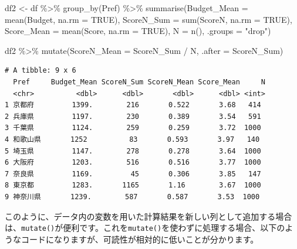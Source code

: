\documentclass[
  a4paper,
  pandoc,
  ja=standard,
  jafont=haranoaji]{bxjsbook}
\newenvironment{Shaded}{\begin{snugshade}}{\end{snugshade}}
\newcommand{\AttributeTok}[1]{\textcolor[rgb]{0.00,0.48,0.65}{#1}}
\newcommand{\ConstantTok}[1]{\textcolor[rgb]{0.56,0.35,0.01}{#1}}
\newcommand{\FunctionTok}[1]{\textcolor[rgb]{0.28,0.35,0.67}{#1}}
\newcommand{\NormalTok}[1]{\textcolor[rgb]{0.00,0.48,0.65}{#1}}
\newcommand{\OtherTok}[1]{\textcolor[rgb]{0.00,0.48,0.65}{#1}}
\newcommand{\SpecialCharTok}[1]{\textcolor[rgb]{0.37,0.37,0.37}{#1}}
\newcommand{\StringTok}[1]{\textcolor[rgb]{0.13,0.47,0.30}{#1}}
\begin{document}
\begin{Shaded}
\begin{Highlighting}[numbers=left,,]
\NormalTok{df2 }\OtherTok{\textless{}{-}}\NormalTok{ df }\SpecialCharTok{\%\textgreater{}\%}
  \FunctionTok{group\_by}\NormalTok{(Pref) }\SpecialCharTok{\%\textgreater{}\%}
  \FunctionTok{summarise}\NormalTok{(}\AttributeTok{Budget\_Mean =} \FunctionTok{mean}\NormalTok{(Budget, }\AttributeTok{na.rm =} \ConstantTok{TRUE}\NormalTok{),}
            \AttributeTok{ScoreN\_Sum  =} \FunctionTok{sum}\NormalTok{(ScoreN, }\AttributeTok{na.rm =} \ConstantTok{TRUE}\NormalTok{),}
            \AttributeTok{Score\_Mean  =} \FunctionTok{mean}\NormalTok{(Score, }\AttributeTok{na.rm =} \ConstantTok{TRUE}\NormalTok{),}
            \AttributeTok{N           =} \FunctionTok{n}\NormalTok{(),}
            \AttributeTok{.groups     =} \StringTok{"drop"}\NormalTok{)}
\end{Highlighting}
\end{Shaded}

\begin{Shaded}
\begin{Highlighting}[numbers=left,,]
\NormalTok{df2 }\SpecialCharTok{\%\textgreater{}\%}
  \FunctionTok{mutate}\NormalTok{(}\AttributeTok{ScoreN\_Mean =}\NormalTok{ ScoreN\_Sum }\SpecialCharTok{/}\NormalTok{ N,}
         \AttributeTok{.after      =}\NormalTok{ ScoreN\_Sum)}
\end{Highlighting}
\end{Shaded}

\begin{verbatim}
# A tibble: 9 x 6
  Pref     Budget_Mean ScoreN_Sum ScoreN_Mean Score_Mean     N
  <chr>          <dbl>      <dbl>       <dbl>      <dbl> <int>
1 京都府         1399.        216       0.522       3.68   414
2 兵庫県         1197.        230       0.389       3.54   591
3 千葉県         1124.        259       0.259       3.72  1000
4 和歌山県       1252          83       0.593       3.97   140
5 埼玉県         1147.        278       0.278       3.64  1000
6 大阪府         1203.        516       0.516       3.77  1000
7 奈良県         1169.         45       0.306       3.85   147
8 東京都         1283.       1165       1.16        3.67  1000
9 神奈川県       1239.        587       0.587       3.53  1000
\end{verbatim}

このように、データ内の変数を用いた計算結果を新しい列として追加する場合は、\texttt{mutate()}が便利です。これを\texttt{mutate()}を使わずに処理する場合、以下のようなコードになりますが、可読性が相対的に低いことが分かります。
\end{document}
